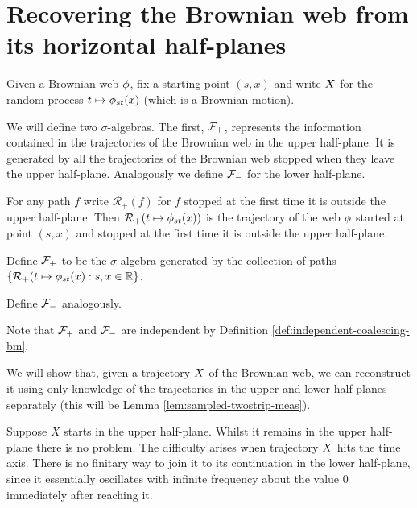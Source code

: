 {
\section{Recovering the Brownian web from its horizontal half-planes}

\label{recovering-from-half-planes}

\begin{notation}
Given a Brownian web $\phi$, fix a starting point $(s,x)$ and write
$X$ for the random process $t \mapsto \phi_{{s}{t}}(x)$
(which is a Brownian motion).
\end{notation}

\newcommand{\restrictupper}{\mathcal{R}_{+}}

We will define two $\sigma$-algebras.  The first, $\mathcal{F}_{+}$,
represents the information contained in the trajectories of the
Brownian web in the upper half-plane.  It is generated by all the
trajectories of the Brownian web stopped when they leave the upper
half-plane.  Analogously we define $\mathcal{F}_{-}$ for the lower
half-plane.

\begin{definition}
  For any path $f$ write $\restrictupper(f)$ for $f$ stopped at the
  first time it is outside the upper half-plane.  Then
  $\restrictupper(t \mapsto \web{s}{t}{x})$ is the trajectory of the
  web $\phi$ started at point $(s,x)$ and stopped at the first
  time it is outside the upper half-plane.

  Define $\mathcal{F}_{+}$ to be the $\sigma$-algebra generated by the
  collection of paths $\{\restrictupper(t \mapsto \web{s}{t}{x} : s,x
  \in \R \}$.

  Define $\mathcal{F}_{-}$ analogously.
\end{definition}

\begin{observation}
  Note that $\mathcal{F}_{+}$ and $\mathcal{F}_{-}$ are independent by Definition
  \ref{def:independent-coalescing-bm}.
\end{observation}

We will show that, given a trajectory $X$ of the Brownian web,
we can reconstruct it using only knowledge of the trajectories in the
upper and lower half-planes separately (this will be Lemma
\ref{lem:sampled-twostrip-meas}).

Suppose $X$ starts in the upper half-plane.  Whilst it remains in the upper
half-plane there is no problem.
The difficulty arises when trajectory $X$
hits the time axis.  There is no finitary way to join
it to its continuation in the lower half-plane, since it essentially
oscillates with infinite frequency about the value $0$ immediately
after reaching it.

}
